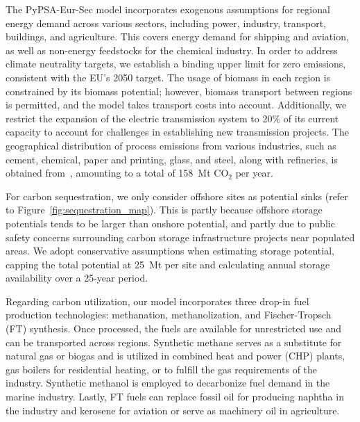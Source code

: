\documentclass[twocolumn]{article}
\newcommand{\carbon}{CO$_2$}
\begin{document}
The PyPSA-Eur-Sec model incorporates exogenous assumptions for regional energy demand across various sectors, including power, industry, transport, buildings, and agriculture. This covers energy demand for shipping and aviation, as well as non-energy feedstocks for the chemical industry. In order to address climate neutrality targets, we establish a binding upper limit for zero emissions, consistent with the EU's 2050 target. The usage of biomass in each region is constrained by its biomass potential; however, biomass transport between regions is permitted, and the model takes transport costs into account. Additionally, we restrict the expansion of the electric transmission system to 20\% of its current capacity to account for challenges in establishing new transmission projects. The geographical distribution of process emissions from various industries, such as cement, chemical, paper and printing, glass, and steel, along with refineries, is obtained from~\cite{piamanzGeoreferencedIndustrialSites2018}, amounting to a total of 158~Mt \carbon{} per year.



For carbon sequestration, we only consider offshore sites as potential sinks (refer to Figure~\ref{fig:sequestration_map}). This is partly because offshore storage potentials tends to be larger than onshore potential, and partly due to public safety concerns surrounding carbon storage infrastructure projects near populated areas. We adopt conservative assumptions when estimating storage potential, capping the total potential at 25~Mt per site and calculating annual storage availability over a 25-year period.



Regarding carbon utilization, our model incorporates three drop-in fuel production technologies: methanation, methanolization, and Fischer-Tropsch (FT) synthesis. Once processed, the fuels are available for unrestricted use and can be transported across regions. Synthetic methane serves as a substitute for natural gas or biogas and is utilized in combined heat and power (CHP) plants, gas boilers for residential heating, or to fulfill the gas requirements of the industry. Synthetic methanol is employed to decarbonize fuel demand in the marine industry. Lastly, FT fuels can replace fossil oil for producing naphtha in the industry and kerosene for aviation or serve as machinery oil in agriculture.
\end{document}
